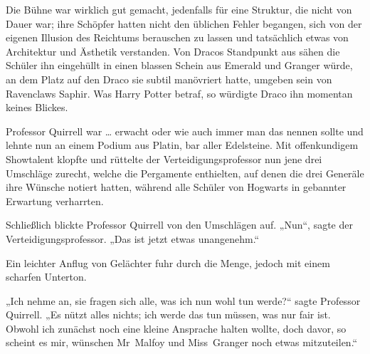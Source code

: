 Die Bühne war wirklich gut gemacht, jedenfalls für eine Struktur, die nicht von Dauer war; ihre Schöpfer hatten nicht den üblichen Fehler begangen, sich von der eigenen Illusion des Reichtums berauschen zu lassen und tatsächlich etwas von Architektur und Ästhetik verstanden. Von Dracos Standpunkt aus sähen die Schüler ihn eingehüllt in einen blassen Schein aus Emerald und Granger würde, an dem Platz auf den Draco sie subtil manövriert hatte, umgeben sein von Ravenclaws Saphir. Was Harry Potter betraf, so würdigte Draco ihn momentan keines Blickes.

Professor Quirrell war … erwacht oder wie auch immer man das nennen sollte und lehnte nun an einem Podium aus Platin, bar aller Edelsteine. Mit offenkundigem Showtalent klopfte und rüttelte der Verteidigungsprofessor nun jene drei Umschläge zurecht, welche die Pergamente enthielten, auf denen die drei Generäle ihre Wünsche notiert hatten, während alle Schüler von Hogwarts in gebannter Erwartung verharrten.

Schließlich blickte Professor Quirrell von den Umschlägen auf.
„Nun“, sagte der Verteidigungsprofessor.
„Das ist jetzt etwas unangenehm.“

Ein leichter Anflug von Gelächter fuhr durch die Menge, jedoch mit einem scharfen Unterton.

„Ich nehme an, sie fragen sich alle, was ich nun wohl tun werde?“ sagte Professor Quirrell.
„Es nützt alles nichts; ich werde das tun müssen, was nur fair ist. Obwohl ich zunächst noch eine kleine Ansprache halten wollte, doch davor, so scheint es mir, wünschen Mr~Malfoy und Miss~Granger noch etwas mitzuteilen.“

